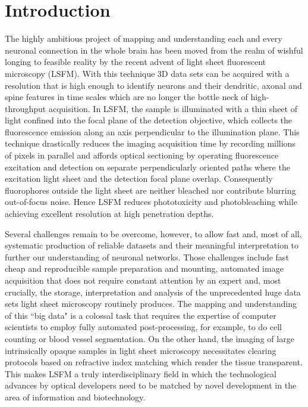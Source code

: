 \documentclass[12pt]{spieman}  %
\begin{document}
\section{Introduction}%
\label{sect:intro}  

The highly ambitious project of mapping and understanding each and every neuronal connection in the whole brain has been moved from the realm of wishful longing to feasible reality by the recent advent of light sheet fluorescent microscopy (LSFM). With this technique 3D data sets can be acquired with a resolution that is high enough to identify neurons and their dendritic, axonal and spine features in time scales which are no longer the bottle neck of high-throughput acquisition. In LSFM, the sample is illuminated with a thin sheet of light confined into the focal plane of the detection objective, which collects the fluorescence emission along an axis perpendicular to the illumination plane\cite{Huisken2009}. This technique drastically reduces the imaging acquisition time by recording millions of pixels in parallel and affords optical sectioning by operating fluorescence excitation and detection on separate perpendicularly oriented paths where the excitation light sheet and the detection focal plane overlap. Consequently fluorophores outside the light sheet are neither bleached nor contribute blurring out-of-focus noise. Hence LSFM reduces phototoxicity and photobleaching while achieving excellent resolution at high penetration depths.

Several challenges remain to be overcome, however, to allow fast and, most of all, systematic production of reliable datasets and their meaningful interpretation to further our understanding of neuronal networks. Those challenges include fast cheap and reproducible sample preparation and mounting, automated image acquisition that does not require constant attention by an expert and, most crucially, the storage, interpretation and analysis of the unprecedented huge data sets light sheet microscopy routinely produces. The mapping and understanding of this ``big data" is a colossal task that requires the expertise of computer scientists to employ fully automated post-processing, for example, to do cell counting or blood vessel segmentation. On the other hand, the imaging of large intrinsically opaque samples in light sheet microscopy necessitates clearing protocols based on refractive index matching which render the tissue transparent. This makes LSFM a truly interdisciplinary field in which the technological advances by optical developers need to be matched by novel development in the area of information and biotechnology.
\end{document}
